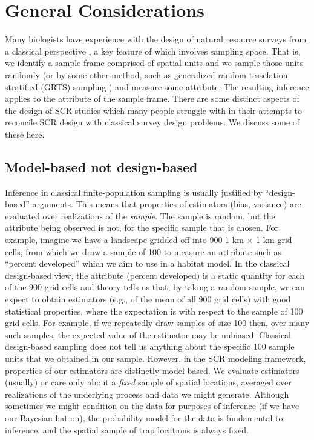 \section{General Considerations}

Many biologists have experience with the design of natural resource
surveys from a classical perspective
\citep{thompson:2002,cochran:2007}, a key feature of which involves
sampling space. That is, we identify a sample frame comprised of
spatial units and we sample those units randomly (or by some other
method, such as generalized random tesselation stratified (GRTS)
sampling \citep{stevens_olsen:2004}) and measure some attribute. The
resulting inference applies to the attribute of the sample
frame. There are some distinct aspects of the design of SCR studies
which many people struggle with in their attempts to reconcile SCR
design with classical survey design problems. We discuss some of these
here.


\subsection{Model-based not design-based}

Inference in classical finite-population sampling is usually
justified by  ``design-based'' arguments. This means
that properties of estimators (bias, variance) are evaluated over
realizations of the {\it sample}. The sample is random, but
the attribute being observed is not, for the specific sample that is
chosen.   For example, imagine we have a landscape gridded off into
900 1
km $\times$ 1 km grid cells,  from which we draw a sample of 100 to
measure an attribute such as ``percent developed'' which we aim to use
in a habitat model. In the classical design-based view, the attribute
(percent developed) is a static quantity for each of the 900 grid
cells and theory tells us that, by taking a random sample, we can
expect to obtain estimators (e.g., of the mean of all 900 grid cells)
with good statistical properties, where the expectation is with
respect to the sample of 100 grid cells. For example, if we 
repeatedly draw samples of size 100 then, over many such samples, the
expected value of the estimator may be unbiased. Classical
design-based sampling does not tell us anything about the specific 100
sample units that we obtained in our sample. 
However, in the SCR modeling
framework, properties of our estimators are distinctly model-based.  We
evaluate estimators (usually) or care only about a {\it fixed} sample
of spatial locations,
averaged over realizations of the underlying process and data we might
generate. Although sometimes we might condition on the data for
purposes of inference (if we have our Bayesian hat on), the
probability model for the data is fundamental to inference, and the
spatial sample of trap locations is always fixed.




